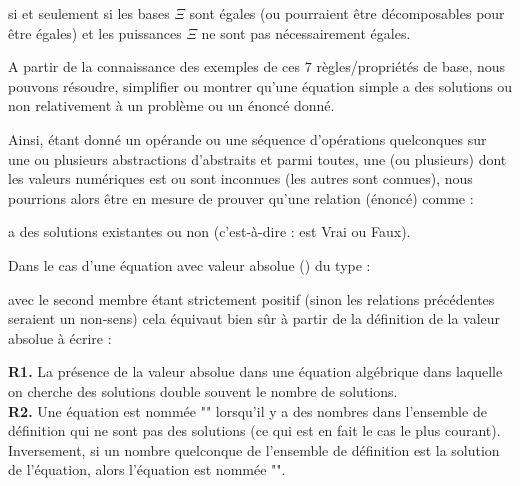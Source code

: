 	si et seulement si les bases $\Xi$ sont égales (ou pourraient être décomposables pour être égales) et les puissances $\Xi$ ne sont pas nécessairement égales.

	A partir de la connaissance des exemples de ces $7$ règles/propriétés de base, nous pouvons résoudre, simplifier ou montrer qu'une équation simple a des solutions ou non relativement à un problème ou un énoncé donné.

	Ainsi, étant donné un opérande ou une séquence d'opérations quelconques sur une ou plusieurs abstractions d'abstraits et parmi toutes, une (ou plusieurs) dont les valeurs numériques est ou sont inconnues (les autres sont connues), nous pourrions alors être en mesure de prouver qu'une relation (énoncé) comme :
	
	a des solutions existantes ou non (c'est-à-dire : est Vrai ou Faux).
	
	Dans le cas d'une équation avec valeur absolue () du type :
	
	avec le second membre étant strictement positif (sinon les relations précédentes seraient un non-sens) cela équivaut bien sûr à partir de la définition de la valeur absolue à écrire :
	

	\begin{tcolorbox}[title=Remarques,colframe=black,arc=10pt]
	\textbf{R1.} La présence de la valeur absolue dans une équation algébrique dans laquelle on cherche des solutions double souvent le nombre de solutions.\\
	
	\textbf{R2.} Une équation est nommée "" lorsqu'il y a des nombres dans l'ensemble de définition qui ne sont pas des solutions (ce qui est en fait le cas le plus courant). Inversement, si un nombre quelconque de l'ensemble de définition est la solution de l'équation, alors l'équation est nommée "".
	\end{tcolorbox}	
	
